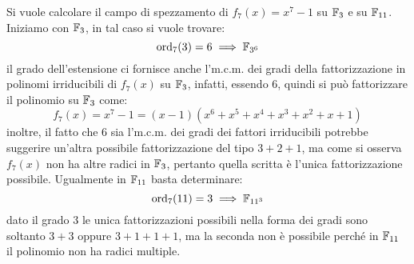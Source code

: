 \documentclass[11pt]{scrartcl}
\begin{document}
\begin{example}
	Si vuole calcolare il campo di spezzamento di $f_7(x) = x^7-1$ su $\mathbb{F}_{3}$ e su $\mathbb{F}_{11}$. Iniziamo con $\mathbb{F}_{3}$, in tal caso si vuole trovare:
		\[\operatorname{ord}_7(3) = 6 \implies \mathbb{F}_{{3}^{6}}
			\]
	il grado dell'estensione ci fornisce anche l'm.c.m. dei gradi della fattorizzazione in polinomi irriducibili di $f_7(x)$ su $\mathbb{F}_{3}$, infatti,
	essendo $6$, quindi si può fattorizzare il polinomio su $\mathbb{F}_{3}$ come:
		\[ f_7(x) = x^7 - 1 = (x-1)(x^6+x^5+x^4+x^3+x^2+x+1)
			\]
	inoltre, il fatto che 6 sia l'm.c.m. dei gradi dei fattori irriducibili potrebbe suggerire un'altra possibile fattorizzazione del tipo $3+2+1$, ma
	come si osserva $f_7(x)$ non ha altre radici in $\mathbb{F}_{3}$, pertanto quella scritta è l'unica fattorizzazione possibile. Ugualmente in $\mathbb{F}_{11}$ basta determinare:
		\[\operatorname{ord}_7(11) = 3 \implies \mathbb{F}_{{11}^{3}}
			\]
		dato il grado $3$ le unica fattorizzazioni possibili nella forma dei gradi sono soltanto $3+3$ oppure $3+1+1+1$, ma la seconda non è
		possibile perché in $\mathbb{F}_{11}$ il polinomio non ha radici multiple.
\end{example}
\end{document}
